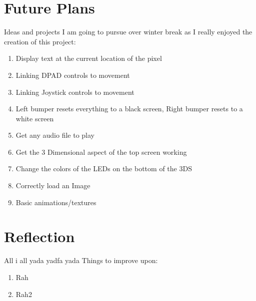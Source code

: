\documentclass{article}
\begin{document}
\section{Future Plans}
Ideas and projects I am going to pursue over winter break as I really enjoyed the creation of this project: 

\begin{enumerate}
\item Display text at the current location of the pixel
\item Linking DPAD controls to movement
\item Linking Joystick controls to movement
\item Left bumper resets everything to a black screen, Right bumper resets to a white screen
\item Get any audio file to play
\item Get the 3 Dimensional aspect of the top screen working
\item Change the colors of the LEDs on the bottom of the 3DS
\item Correctly load an Image
\item Basic animations/textures
\end{enumerate}


\section{Reflection}
All i all yada yadfa yada
Things to improve upon:
\begin{enumerate}
    \item Rah
    \item Rah2
\end{enumerate}
\end{document}
